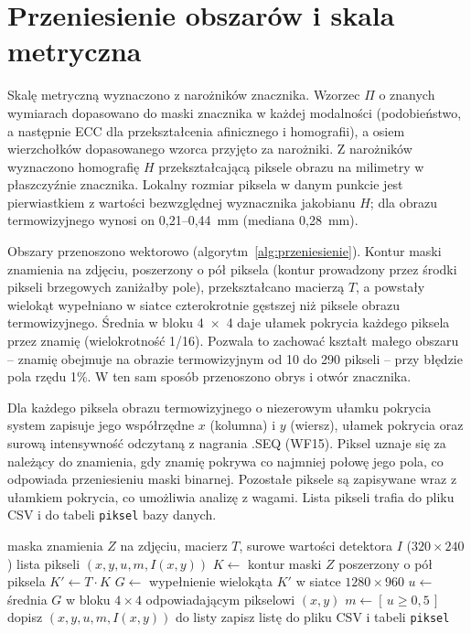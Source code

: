 \section{Przeniesienie obszarów i skala metryczna}
\label{sec:impl-przeniesienie}

Skalę metryczną wyznaczono z narożników znacznika. Wzorzec $\Pi$ o znanych wymiarach dopasowano do maski znacznika w każdej modalności (podobieństwo, a następnie ECC dla przekształcenia afinicznego i homografii), a osiem wierzchołków dopasowanego wzorca przyjęto za narożniki. Z narożników wyznaczono homografię $H$ przekształcającą piksele obrazu na milimetry w płaszczyźnie znacznika. Lokalny rozmiar piksela w danym punkcie jest pierwiastkiem z wartości bezwzględnej wyznacznika jakobianu $H$; dla obrazu termowizyjnego wynosi on 0,21--0,44~mm (mediana 0,28~mm).

Obszary przenoszono wektorowo (algorytm~\ref{alg:przeniesienie}). Kontur maski znamienia na zdjęciu, poszerzony o pół piksela (kontur prowadzony przez środki pikseli brzegowych zaniżałby pole), przekształcano macierzą $T$, a powstały wielokąt wypełniano w siatce czterokrotnie gęstszej niż piksele obrazu termowizyjnego. Średnia w bloku 4~$\times$~4 daje ułamek pokrycia każdego piksela przez znamię (wielokrotność 1/16). Pozwala to zachować kształt małego obszaru -- znamię obejmuje na obrazie termowizyjnym od 10 do 290 pikseli -- przy błędzie pola rzędu 1\%. W ten sam sposób przenoszono obrys i otwór znacznika.

Dla każdego piksela obrazu termowizyjnego o niezerowym ułamku pokrycia system zapisuje jego współrzędne $x$ (kolumna) i $y$ (wiersz), ułamek pokrycia oraz surową intensywność odczytaną z nagrania .SEQ (WF15). Piksel uznaje się za należący do znamienia, gdy znamię pokrywa co najmniej połowę jego pola, co odpowiada przeniesieniu maski binarnej. Pozostałe piksele są zapisywane wraz z ułamkiem pokrycia, co umożliwia analizę z wagami. Lista pikseli trafia do pliku CSV i do tabeli \texttt{piksel} bazy danych.

\begin{algorithm}[htbp]
  \caption{Przeniesienie znamienia na obraz termowizyjny i zapis pikseli}
  \label{alg:przeniesienie}
  \small
  \begin{algorithmic}[1]
    \Require maska znamienia $Z$ na zdjęciu, macierz $T$, surowe wartości detektora $I$ ($320 \times 240$)
    \Ensure lista pikseli $(x, y, u, m, I(x, y))$
    \State $K \gets$ kontur maski $Z$ poszerzony o pół piksela
    \State $K' \gets T \cdot K$ 
    \State $G \gets$ wypełnienie wielokąta $K'$ w siatce $1280 \times 960$ 
      \State $u \gets$ średnia $G$ w bloku $4 \times 4$ odpowiadającym pikselowi $(x, y)$
        \State $m \gets [\,u \geq 0{,}5\,]$ 
        \State dopisz $(x, y, u, m, I(x, y))$ do listy
      \EndIf
    \EndFor
    \State zapisz listę do pliku CSV i tabeli \texttt{piksel}
  \end{algorithmic}
\end{algorithm}

